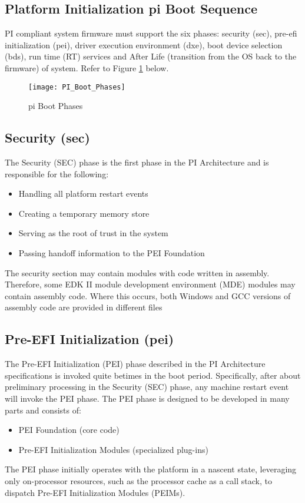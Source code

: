 \subsection{Platform Initialization \gls{pi} Boot Sequence}
PI compliant system firmware must support the six phases: security (\gls{sec}), pre-efi initialization (\gls{pei}), driver execution environment (\gls{dxe}), boot device selection (\gls{bds}), run time (RT) services and After Life (transition from the OS back to the firmware) of system. Refer to Figure \ref{fig:design-pi-boot-phases} below.

\begin{figure}[h]
	\texttt{[image: PI\_Boot\_Phases]}
	\caption{\gls{pi} Boot Phases}\label{fig:design-pi-boot-phases}
\end{figure}

\subsection{Security (\gls{sec})}
The Security (SEC) phase is the first phase in the PI Architecture and is responsible for the following:
\begin{itemize}
	\item Handling all platform restart events
	\item Creating a temporary memory store
	\item Serving as the root of trust in the system
	\item Passing handoff information to the PEI Foundation
\end{itemize}
The security section may contain modules with code written in assembly. Therefore, some EDK II module development environment (MDE) modules may contain assembly code. Where this occurs, both Windows and GCC versions of assembly code are provided in different files

\subsection{Pre-EFI Initialization (\gls{pei})}
The Pre-EFI Initialization (PEI) phase described in the PI Architecture specifications is invoked quite betimes in the boot period. Specifically, after about preliminary processing in the Security (SEC) phase, any machine restart event will invoke the PEI phase.
The PEI phase is designed to be developed in many parts and consists of:
\begin{itemize}
	\item PEI Foundation (core code)
	\item Pre-EFI Initialization Modules (specialized plug-ins)
\end{itemize}
The PEI phase initially operates with the platform in a nascent state, leveraging only on-processor resources, such as the processor cache as a call stack, to dispatch Pre-EFI Initialization Modules (PEIMs).

